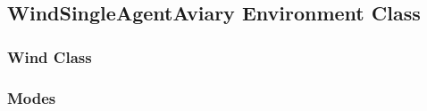\subsection{WindSingleAgentAviary Environment Class}

\newpage

\subsubsection{Wind Class}

\newpage

\subsubsection{Modes}\label{sec:modes}

\newpage

